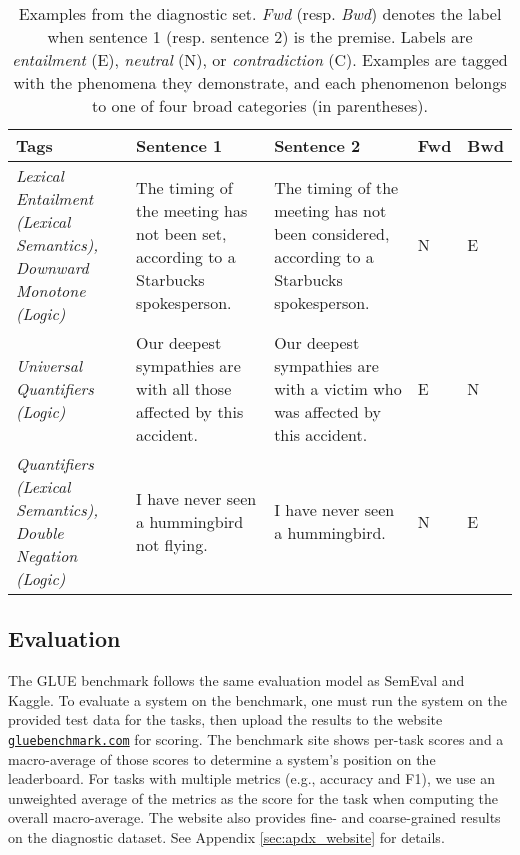 \documentclass{article} \usepackage{iclr2019_conference,times}
\begin{document}
\begin{table*}[t]
\small
\centering
\begin{tabularx}{\textwidth}{XXXll}
\toprule
 \textbf{Tags} & \textbf{Sentence 1} & \textbf{Sentence 2} & \textbf{Fwd} & \textbf{Bwd} \\
\midrule
\it Lexical Entailment (Lexical Semantics), Downward Monotone (Logic) & The timing of the meeting has not been set, according to a Starbucks spokesperson. & The timing of the meeting has not been considered, according to a Starbucks spokesperson. & N & E \\ \midrule
\it Universal Quantifiers (Logic) & Our deepest sympathies are with all those affected by this accident. & Our deepest sympathies are with a victim who was affected by this accident. & E & N \\ \midrule
\it Quantifiers (Lexical Semantics), Double Negation (Logic) & I have never seen a hummingbird not flying. & I have never seen a hummingbird. & N & E \\
\bottomrule
\end{tabularx}
\caption{Examples from the diagnostic set. \textit{Fwd} (resp. \textit{Bwd}) denotes the label when sentence 1 (resp. sentence 2) is the premise. Labels are \textit{entailment} (E), \textit{neutral} (N), or \textit{contradiction} (C).
Examples are tagged with the phenomena they demonstrate, and each phenomenon belongs to one of four broad categories (in parentheses).
}
\label{tab:analysis-examples}
\end{table*}



\subsection{Evaluation}
The GLUE benchmark follows the same evaluation model as SemEval and Kaggle. To evaluate a system on the benchmark, one must run the system on the provided test data for the tasks, then upload the results to the website \href{https://gluebenchmark.com}{\tt gluebenchmark.com} for scoring. 
The benchmark site shows per-task scores and a macro-average of those scores to determine a system's position on the leaderboard.
For tasks with multiple metrics (e.g., accuracy and F1), we use an unweighted average of the metrics as the score for the task when computing the overall macro-average.
The website also provides fine- and coarse-grained results on the diagnostic dataset. See Appendix \ref{sec:apdx_website} for details.
\end{document}
